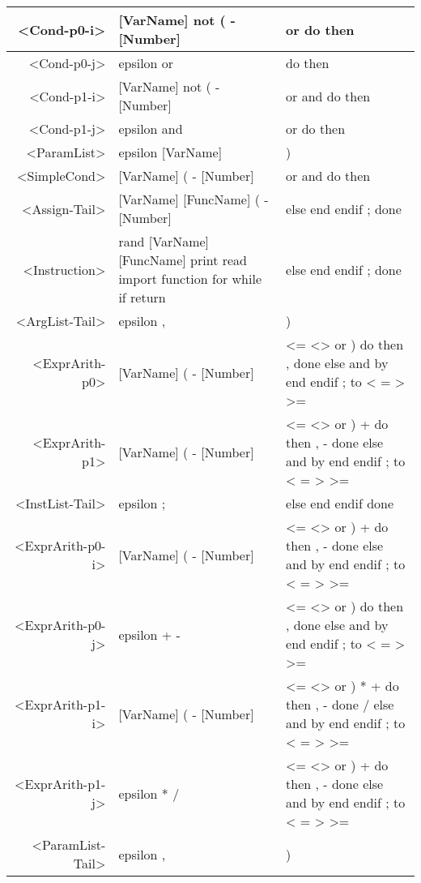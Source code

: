 \begin{longtable}{r p{7cm} p{7cm}}
<Cond-p0-i> & [VarName] not ( - [Number]  & or do then \\ \hline
<Cond-p0-j> & epsilon or  & do then \\ \hline
<Cond-p1-i> & [VarName] not ( - [Number]  & or and do then \\ \hline
<Cond-p1-j> & epsilon and  & or do then \\ \hline
<ParamList> & epsilon [VarName]  & ) \\ \hline
<SimpleCond> & [VarName] ( - [Number]  & or and do then \\ \hline
<Assign-Tail> & [VarName] [FuncName] ( - [Number]  & else end endif ; done \\ \hline
<Instruction> & rand [VarName] [FuncName] print read import function for while if return  & else end endif ; done \\ \hline
<ArgList-Tail> & epsilon ,  & ) \\ \hline
<ExprArith-p0> & [VarName] ( - [Number]  & <= <> or ) do then , done else and by end endif ; to < = > >= \\ \hline
<ExprArith-p1> & [VarName] ( - [Number]  & <= <> or ) + do then , - done else and by end endif ; to < = > >= \\ \hline
<InstList-Tail> & epsilon ;  & else end endif done \\ \hline
<ExprArith-p0-i> & [VarName] ( - [Number]  & <= <> or ) + do then , - done else and by end endif ; to < = > >= \\ \hline
<ExprArith-p0-j> & epsilon + -  & <= <> or ) do then , done else and by end endif ; to < = > >= \\ \hline
<ExprArith-p1-i> & [VarName] ( - [Number]  & <= <> or ) * + do then , - done / else and by end endif ; to < = > >= \\ \hline
<ExprArith-p1-j> & epsilon * /  & <= <> or ) + do then , - done else and by end endif ; to < = > >= \\ \hline
<ParamList-Tail> & epsilon ,  & ) 
\end{longtable}

